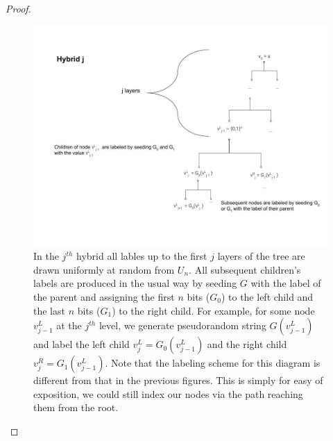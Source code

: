 \begin{proof}
\begin{figure}
\centering
\includegraphics[width=\textwidth, height=0.25\paperheight, keepaspectratio]{../figure/hybrid_j_thm_5-1.jpg}
\caption{In the \(j^{th}\) hybrid all lables up to the first \(j\)
layers of the tree are drawn uniformly at random from \(U_{n}\). All
subsequent children's labels are produced in the usual way by seeding
\(G\) with the label of the parent and assigning the first \(n\) bits
(\(G_{0}\)) to the left child and the last \(n\) bits (\(G_{1}\)) to the
right child. For example, for some node \(v^{L}_{j-1}\) at the
\(j^{th}\) level, we generate pseudorandom string \(G(v^{L}_{j-1})\) and
label the left child \(v^{L}_{j} = G_{0}(v^{L}_{j-1})\) and the right
child \(v^{R}_{j} = G_{1}(v^{L}_{j-1})\). Note that the labeling scheme
for this diagram is different from that in the previous figures. This is
simply for easy of exposition, we could still index our nodes via the
path reaching them from the root.}
\label{hybridj}
\end{figure}



\end{proof}
